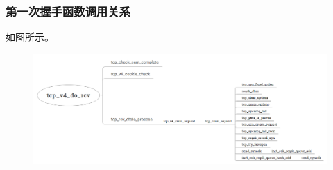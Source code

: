             \subsubsection{第一次握手函数调用关系}
				如图所示。
                \begin{figure}[htb]        
                    \centering
                    \includegraphics[width=\textwidth]  {images/Server:Receive SYN.png}
                \end{figure}       
